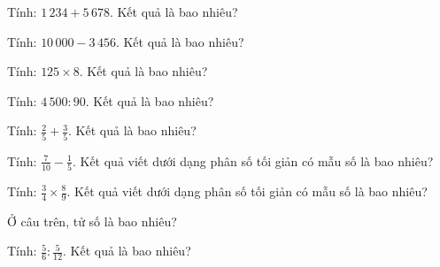 
\begin{ex}
  Tính: $1\,234 + 5\,678$. Kết quả là bao nhiêu?
\end{ex}

\begin{ex}
  Tính: $10\,000 - 3\,456$. Kết quả là bao nhiêu?
\end{ex}

\begin{ex}
  Tính: $125 \times 8$. Kết quả là bao nhiêu?
\end{ex}

\begin{ex}
  Tính: $4\,500 : 90$. Kết quả là bao nhiêu?
\end{ex}

\begin{ex}
  Tính: $\frac{2}{5} + \frac{3}{5}$. Kết quả là bao nhiêu?
\end{ex}

\begin{ex}
  Tính: $\frac{7}{10} - \frac{1}{5}$. Kết quả viết dưới dạng phân số tối giản có mẫu số là bao nhiêu?
\end{ex}

\begin{ex}
  Tính: $\frac{3}{4} \times \frac{8}{9}$. Kết quả viết dưới dạng phân số tối giản có mẫu số là bao nhiêu?
\end{ex}

\begin{ex}
  Ở câu trên, tử số là bao nhiêu?
\end{ex}

\begin{ex}
  Tính: $\frac{5}{6} : \frac{5}{12}$. Kết quả là bao nhiêu?
\end{ex}


